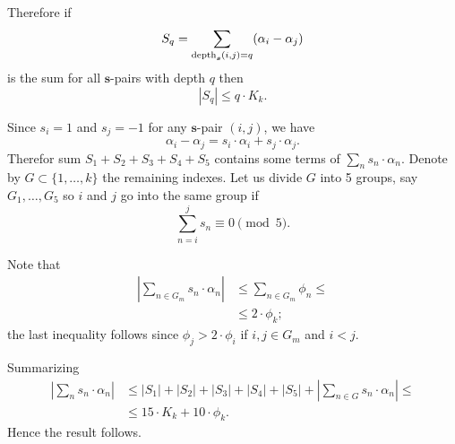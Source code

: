 \documentclass[a4paper,10pt]{amsart}
\begin{document}
Therefore if 
\[S_q=\sum_{\mathop{\rm depth}\nolimits_{\bm{s}}(i,j)=q} (\alpha_i-\alpha_j)\] 
is the sum for all $\bm{s}$-pairs with depth $q$ then 
\[|S_q|\le q\cdot K_k.\]

Since $s_i=1$ and $s_j=-1$ for any $\bm{s}$-pair $(i,j)$,
we have
\[\alpha_i-\alpha_j=s_i\cdot\alpha_i+s_j\cdot\alpha_j.\]
Therefor sum  $S_1+S_2+S_3+S_4+S_5$  contains some  terms of 
$\sum_{n} s_n\cdot \alpha_n$.
Denote by $G\subset\{1,\dots,k\}$ the remaining indexes.
Let us divide $G$ into 5 groups, say $G_1,\dots,G_5$ 
so $i$ and $j$ go into the same group if 
\[\sum_{n=i}^j s_n\equiv 0\pmod 5.\]

Note that
\begin{align*}
|\sum_{n\in G_m}s_n\cdot \alpha_n|
&\le \sum_{n\in G_m}\phi_n\le
\\
&\le 2\cdot\phi_k;
\end{align*}
the last inequality follows since
$\phi_j>2\cdot \phi_i$
if $i,j\in G_m$ and $i<j$.

Summarizing
\begin{align*}
|\sum_n s_n\cdot\alpha_n|&\le |S_1|+|S_2|+|S_3|+|S_4|+|S_5|+|\sum_{n\in G} s_n\cdot\alpha_n|\le
\\
&\le 15\cdot K_k+10\cdot \phi_k.
\end{align*}
Hence the result follows.
\qeds
\end{document}
